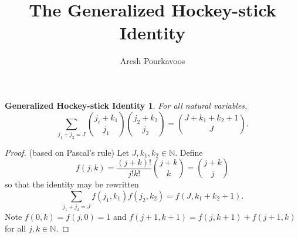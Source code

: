 \documentclass{article}
\begin{document}
\title{The Generalized Hockey-stick Identity}
\author{Aresh Pourkavoos}
\maketitle

\newtheorem*{GHSI}{Generalized Hockey-stick Identity}

\begin{GHSI}

  For all natural variables,
  \[\sum_{j_1+j_2=J}\binom{j_i+k_1}{j_1}\binom{j_2+k_2}{j_2} = \binom{J+k_1+k_2+1}{J}.\]

\end{GHSI}

\begin{proof}
  (based on Pascal's rule)
  Let $J, k_1, k_2 \in \mathbb{N}$. Define
  \[f(j, k) = \frac{(j+k)!}{j!k!} \binom{j+k}{k} = \binom{j+k}{j}\]
  so that the identity may be rewritten 
  \[\sum_{j_1+j_2=J}f(j_1, k_1)f(j_2, k_2) = f(J, k_1+k_2+1).\]
  Note $f(0, k)=f(j, 0)=1$ and $f(j+1, k+1)=f(j, k+1)+f(j+1, k)$ for all $j, k\in\mathbb{N}$.


\end{proof}
\end{document}
